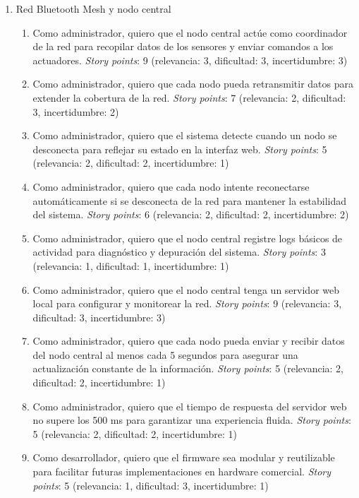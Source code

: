 \documentclass[
11pt, %
]{charter}
\begin{document}
\begin{enumerate}
\item Red Bluetooth Mesh y nodo central
\begin{enumerate}
	\item Como administrador, quiero que el nodo central actúe como coordinador de la red para recopilar datos de los sensores y enviar comandos a los actuadores. \textit{Story points}: 9 (relevancia: 3, dificultad: 3, incertidumbre: 3)

	\item Como administrador, quiero que cada nodo pueda retransmitir datos para extender la cobertura de la red. \textit{Story points}: 7 (relevancia: 2, dificultad: 3, incertidumbre: 2)

	\item Como administrador, quiero que el sistema detecte cuando un nodo se desconecta para reflejar su estado en la interfaz web. \textit{Story points}: 5 (relevancia: 2, dificultad: 2, incertidumbre: 1)

	\item Como administrador, quiero que cada nodo intente reconectarse automáticamente si se desconecta de la red para mantener la estabilidad del sistema. \textit{Story points}: 6 (relevancia: 2, dificultad: 2, incertidumbre: 2)

	\item Como administrador, quiero que el nodo central registre logs básicos de actividad para diagnóstico y depuración del sistema. \textit{Story points}: 3 (relevancia: 1, dificultad: 1, incertidumbre: 1)

	\item Como administrador, quiero que el nodo central tenga un servidor web local para configurar y monitorear la red. \textit{Story points}: 9 (relevancia: 3, dificultad: 3, incertidumbre: 3)

	\item Como administrador, quiero que cada nodo pueda enviar y recibir datos del nodo central al menos cada 5 segundos para asegurar una actualización constante de la información. \textit{Story points}: 5 (relevancia: 2, dificultad: 2, incertidumbre: 1)

	\item Como administrador, quiero que el tiempo de respuesta del servidor web no supere los 500 ms para garantizar una experiencia fluida. \textit{Story points}: 5 (relevancia: 2, dificultad: 2, incertidumbre: 1)

	\item Como desarrollador, quiero que el firmware sea modular y reutilizable para facilitar futuras implementaciones en hardware comercial. \textit{Story points}: 5 (relevancia: 1, dificultad: 3, incertidumbre: 1)
\end{enumerate}



\end{enumerate}
\end{document}
